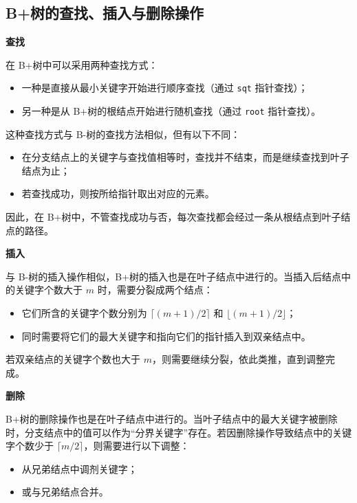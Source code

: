 \documentclass[lang=cn,newtx,10pt,scheme=chinese]{elegantbook}
\begin{document}
   \subsection{B+树的查找、插入与删除操作}

   \textbf{查找}
   
      在 B+树中可以采用两种查找方式：
      \begin{itemize}
        \item 一种是直接从最小关键字开始进行顺序查找（通过 \texttt{sqt} 指针查找）；
        \item 另一种是从 B+树的根结点开始进行随机查找（通过 \texttt{root} 指针查找）。
      \end{itemize}
   
      这种查找方式与 B-树的查找方法相似，但有以下不同：
      \begin{itemize}
        \item 在分支结点上的关键字与查找值相等时，查找并不结束，而是继续查找到叶子结点为止；
        \item 若查找成功，则按所给指针取出对应的元素。
      \end{itemize}
   
      因此，在 B+树中，不管查找成功与否，每次查找都会经过一条从根结点到叶子结点的路径。
   
   
    \textbf{插入}

      与 B-树的插入操作相似，B+树的插入也是在叶子结点中进行的。当插入后结点中的关键字个数大于 $m$ 时，需要分裂成两个结点：
      \begin{itemize}
        \item 它们所含的关键字个数分别为 $\lceil (m+1)/2 \rceil$ 和 $\lfloor (m+1)/2 \rfloor$；
        \item 同时需要将它们的最大关键字和指向它们的指针插入到双亲结点中。
      \end{itemize}
   
      若双亲结点的关键字个数也大于 $m$，则需要继续分裂，依此类推，直到调整完成。
   
   
    \textbf{删除}

      B+树的删除操作也是在叶子结点中进行的。当叶子结点中的最大关键字被删除时，分支结点中的值可以作为“分界关键字”存在。若因删除操作导致结点中的关键字个数少于 $\lceil m/2 \rceil$，则需要进行以下调整：
      \begin{itemize}
        \item 从兄弟结点中调剂关键字；
        \item 或与兄弟结点合并。
      \end{itemize}
   
\end{document}
